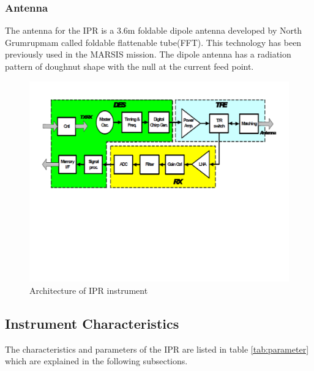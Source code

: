 \subsubsection{Antenna}
The antenna for the \ac{IPR} is a 3.6m foldable dipole antenna developed by North Grumrupmam called foldable flattenable tube(FFT). This technology  has been previously used in the \ac{MARSIS} mission. The dipole antenna has a radiation pattern of doughnut shape with the null at the  current feed point.
\begin{figure}[bht]
\centering
\includegraphics[scale=0.5]{Figures/IPR_Architecture.pdf}
\caption{Architecture of \ac{IPR} instrument \cite{IPR_performance}}
\label{fig:IPR_achitecture}
\end{figure}
%
\subsection{Instrument Characteristics}
The characteristics and parameters of the \ac{IPR} are listed in table \ref{tab:parameter} which are explained in the following subsections.\\

